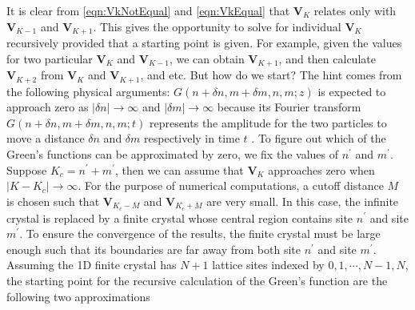  It is clear from 
\autoref{eqn:VkNotEqual} and \autoref{eqn:VkEqual} that $\mathbf{V}_{K}$ relates only with  $\mathbf{V}_{K-1}$ and 
 $\mathbf{V}_{K+1}$. This gives the opportunity to solve for individual $\mathbf{V}_{K}$ recursively provided that 
a starting point is given. For example, given the values for two particular $\mathbf{V}_{K}$ and 
$\mathbf{V}_{K-1}$, we can obtain $\mathbf{V}_{K+1}$, and then calculate $\mathbf{V}_{K+2}$ from $\mathbf{V}_{K}$ 
and $\mathbf{V}_{K+1}$, and etc.  
But how do we start? The hint comes from the following physical arguments: $G(n+\delta n, m+\delta m, n, m; z)$ is 
expected to approach zero as $|\delta n| \rightarrow \infty$ and $|\delta m| \rightarrow \infty$ because its Fourier
transform $G(n+\delta n, m+\delta m, n, m; t)$ represents the amplitude for the two particles to move a distance
 $\delta n$ and  $\delta m$ respectively in time $t$ \cite{economou2006, Berciu2010}. To figure out which of the Green's 
functions can be approximated by zero, we fix  the values of $n^{\prime}$ and $m^{\prime}$. Suppose
 $K_c = n^{\prime} + m^{\prime}$, then we can assume that $\mathbf{V}_{K}$ approaches zero when 
$|K - K_c | \rightarrow \infty$. For the purpose of numerical computations, a cutoff distance $M$ is chosen such that
$\mathbf{V}_{K_c - M}$ and $\mathbf{V}_{K_c + M}$ are very small. In this case, the infinite crystal is 
replaced by a finite crystal whose central region contains site $n^{\prime}$ and site $m^{\prime}$. To ensure the
convergence of the results, the finite crystal must be large enough such that its boundaries are  far away
from both site $n^{\prime}$ and site $m^{\prime}$. Assuming the 1D finite crystal has $N+1$ lattice sites indexed by $0, 1, \cdots, 
N-1, N$, the starting point for the recursive calculation of the Green's function are the following two 
approximations

